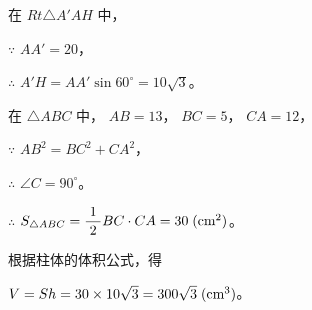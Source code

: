 \begin{enhancedline}
在 $Rt \triangle A'AH$ 中，

$\because$ \quad $AA' = 20$，

$\therefore$ \quad $A'H = AA' \sin 60^\circ = 10\sqrt{3}$。

在 $\triangle ABC$ 中， $AB = 13$， $BC = 5$， $CA = 12$，

$\because$ \quad $AB^2 = BC^2 + CA^2$，

$\therefore$ \quad $\angle C = 90^\circ$。

$\therefore$ \quad $S_{\triangle ABC} = \dfrac{\; 1 \;}{2} BC \cdot CA = 30 \; (\mathord{\text{cm}^2})$。

\hspace*{-2em}根据柱体的体积公式，得

$V = Sh = 30 \times 10\sqrt{3} = 300\sqrt{3} \; (\mathord{\text{cm}^3})$。


\begin{lianxi}



\end{lianxi}

\end{enhancedline}

